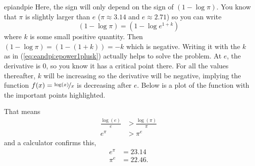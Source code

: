 \begin{answer}{epiandpie}
Here, the sign will only depend on the sign of
$(1 - \log \pi)$.
You know that $\pi$ is slightly larger than $e$
($\pi \approx 3.14$ and $e \approx 2.71$)
so you can write
\begin{equation}
\label{eq:eandpi:epower1plusk}
(1 - \log \pi)
=
(1 - \log e^{1 + k})
\end{equation}
where $k$ is some small positive quantity.
Then
$(1 - \log \pi) =
(1 - (1 + k) ) = - k $ which is negative.
Writing it with the $k$ as in (\ref{eq:eandpi:epower1plusk}) actually helps to solve the problem.
At $e$, the derivative is 0, so you know it has a critical point there.
For all the values thereafter, $k$ will be increasing so the derivative will be negative, implying the function $f(x)=\nicefrac{\log(x)}{x}$ is decreasing after $e$.
Below is a plot of the function with the important points highlighted.
\begin{center}
\end{center}
That means
\begin{align*}
\frac{\log(e)}{e}
&>
\frac{\log(\pi)}{\pi}
\\
e^\pi
&>
\pi^e
\end{align*}
and a calculator confirms this,
\begin{align*}
e^\pi &= 23.14
\\
\pi^e &= 22.46
\text{.}
\end{align*}
\end{answer}
